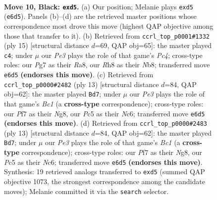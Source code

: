 \documentclass[11pt]{article}
\begin{document}
\clearpage

\begin{figure}[p]\centering
\begin{subfigure}{0.46\textwidth}\centering
\resizebox{\linewidth}{!}{%
\newchessgame
\chessboard[
  setfen={rn2kbnr/1p3ppp/pq2p3/2pPP2b/3P3P/1P2BN2/P3BPP1/RN1QK2R b KQkq - 0 10},
  showmover=false,
  pgfstyle=straightmove, color=movearrow, markmove={e6-d5}
]}
\caption{}
\end{subfigure}\hfill
\begin{subfigure}{0.46\textwidth}\centering
\resizebox{\linewidth}{!}{%
\newchessgame
\chessboard[
  setfen={rn2kbnr/pp3ppp/1q2p3/2ppPb2/1P1P4/P1P4P/4NPP1/RNBQKB1R b KQkq - 0 8},
  showmover=false,
  pgfstyle=straightmove, color=movearrow, markmove={c5-c4}
]}
\caption{}
\end{subfigure}
\\[4pt]
\begin{subfigure}{0.46\textwidth}\centering
\resizebox{\linewidth}{!}{%
\newchessgame
\chessboard[
  setfen={r1b1kbnr/1p3ppp/1qn1p3/p1ppP3/3P4/P1PB1N2/1P3PPP/RNBQK2R b KQkq - 1 7},
  showmover=false,
  pgfstyle=straightmove, color=movearrow, markmove={c8-d7}
]}
\caption{}
\end{subfigure}\hfill
\begin{subfigure}{0.46\textwidth}\centering
\resizebox{\linewidth}{!}{%
\newchessgame
\chessboard[
  setfen={r1b1kbnr/1p3ppp/1qn1p3/p1ppP3/3P4/P1PB1N2/1P3PPP/RNBQK2R b KQkq - 1 7},
  showmover=false,
  pgfstyle=straightmove, color=movearrow, markmove={c8-d7}
]}
\caption{}
\end{subfigure}
\caption{\textbf{Move 10, Black: \texttt{exd5}.} (a) Our position; Melanie plays \texttt{exd5} (\texttt{e6d5}). Panels (b)--(d) are the retrieved master positions whose correspondence most drove this move (highest QAP objective among those that transfer to it). (b) Retrieved from \texttt{ccrl\_top\_p0001\#1332} (ply 15) [structural distance $d$=69, QAP obj=65]: the master played \texttt{c4}; under $\mu$ our \emph{Pe3} plays the role of that game's \emph{Pc4}; cross-type roles: our \emph{P}g7 as their \emph{R}a8, our \emph{R}h8 as their \emph{N}b8; transferred move \texttt{e6d5} \textbf{(endorses this move)}. (c) Retrieved from \texttt{ccrl\_top\_p0000\#2482} (ply 13) [structural distance $d$=84, QAP obj=62]: the master played \texttt{Bd7}; under $\mu$ our \emph{Pe3} plays the role of that game's \emph{Bc1} (a \textbf{cross-type} correspondence); cross-type roles: our \emph{P}f7 as their \emph{N}g8, our \emph{P}c5 as their \emph{N}c6; transferred move \texttt{e6d5} \textbf{(endorses this move)}. (d) Retrieved from \texttt{ccrl\_top\_p0000\#2483} (ply 13) [structural distance $d$=84, QAP obj=62]: the master played \texttt{Bd7}; under $\mu$ our \emph{Pe3} plays the role of that game's \emph{Bc1} (a \textbf{cross-type} correspondence); cross-type roles: our \emph{P}f7 as their \emph{N}g8, our \emph{P}c5 as their \emph{N}c6; transferred move \texttt{e6d5} \textbf{(endorses this move)}. Synthesis: 19 retrieved analogs transferred to \texttt{exd5} (summed QAP objective 1073, the strongest correspondence among the candidate moves); Melanie committed it via the \texttt{search} selector.}
\label{fig:thought-m19}
\end{figure}
\end{document}
